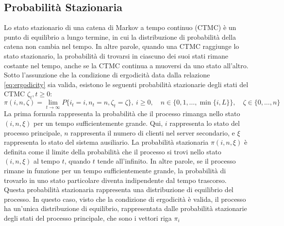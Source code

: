 \documentclass[11pt]{article}
\begin{document}
\subsection{Probabilità Stazionaria}

Lo stato stazionario di una catena di Markov a tempo continuo (CTMC) è un punto di equilibrio a lungo termine, in cui la distribuzione di probabilità della catena non cambia nel tempo. In altre parole, quando una CTMC raggiunge lo stato stazionario, la probabilità di trovarsi in ciascuno dei suoi stati rimane costante nel tempo, anche se la CTMC continua a muoversi da uno stato all'altro. Sotto l'assunzione che la condizione di ergodicità data dalla relazione \ref{eq:ergodicity} sia valida, esistono le seguenti probabilità stazionarie degli stati del CTMC $\zeta_t, t \geq 0$:
\begin{equation}
    \pi(i,n,\zeta) = \lim_{t \to \infty} P\{i_t = i, n_t = n, \zeta_t = \zeta\}, ~ i \geq 0, \quad n \in \{0, 1, \dots , \min\{i,L\}\}, \quad \zeta \in \{0, \dots, n\}
\end{equation}
La prima formula rappresenta la probabilità che il processo rimanga nello stato $(i,n,\xi)$ per un tempo sufficientemente grande. Qui, $i$ rappresenta lo stato del processo principale, $n$ rappresenta il numero di clienti nel server secondario, e $\xi$ rappresenta lo stato del sistema ausiliario. La probabilità stazionaria $\pi(i,n,\xi)$ è definita come il limite della probabilità che il processo si trovi nello stato $(i,n,\xi)$ al tempo $t$, quando $t$ tende all'infinito. In altre parole, se il processo rimane in funzione per un tempo sufficientemente grande, la probabilità di trovarlo in uno stato particolare diventa indipendente dal tempo trascorso. Questa probabilità stazionaria rappresenta una distribuzione di equilibrio del processo. In questo caso, visto che la condizione di ergodicità è valida, il processo ha un'unica distribuzione di equilibrio, rappresentata dalle probabilità stazionarie degli stati del processo principale, che sono i vettori riga $\pi_i$ \\
\end{document}
